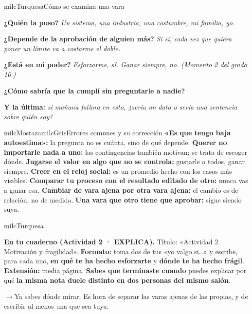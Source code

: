 \documentclass[11pt,letterpaper]{article}
\newcommand{\puente}[1]{%
  \begin{puentebox}%
    \textcolor{milcGradeDark}{$\rightarrow$}\hspace{2mm}#1%
  \end{puentebox}%
}
\begin{document}
\begin{drawbox}{milcTurquesa}{Cómo se examina una vara}
\begin{pasoslista}
\item \textbf{¿Quién la puso?} \emph{Un sistema, una industria, una costumbre, mi familia, yo.}
\item \textbf{¿Depende de la aprobación de alguien más?} \emph{Si sí, cada vez que quiera poner un límite va a costarme el doble.}
\item \textbf{¿Está en mi poder?} \emph{Esforzarme, sí. Ganar siempre, no. \emph{(Momento 2 del grado 10.)}}
\item \textbf{¿Cómo sabría que la cumplí sin preguntarle a nadie?}
\item \textbf{Y la última:} \emph{si mañana fallara en esto, ¿sería un dato o sería una sentencia sobre quién soy?}
\end{pasoslista}
\end{drawbox}

\begin{softbox}{milcMostaza}{milcGris}{Errores comunes y su corrección}
\textbf{«Es que tengo baja autoestima»:} la pregunta no es cuánta, sino de qué depende. \textbf{Querer no importarle nada a uno:} las contingencias también motivan; se trata de escoger dónde. \textbf{Jugarse el valor en algo que no se controla:} gustarle a todos, ganar siempre. \textbf{Creer en el reloj social:} es un promedio hecho con los casos más visibles. \textbf{Comparar tu proceso con el resultado editado de otro:} nunca vas a ganar esa. \textbf{Cambiar de vara ajena por otra vara ajena:} el cambio es de relación, no de medida. \textbf{Una vara que otro tiene que aprobar:} sigue siendo suya.
\end{softbox}

\begin{infoband}{milcTurquesa}


\textbf{En tu cuaderno (Actividad 2 · EXPLICA).} Título: «Actividad 2. Motivación y fragilidad». \textbf{Formato:} toma dos de tus «yo valgo si\ldots» y escribe, para cada uno, \textbf{en qué te ha hecho esforzarte} y \textbf{dónde te ha hecho frágil}. \textbf{Extensión:} media página. \textbf{Sabes que terminaste cuando} puedes explicar por qué \textbf{la misma nota duele distinto en dos personas del mismo salón}.
\end{infoband}

\puente{Ya sabes dónde mirar. Es hora de separar las varas ajenas de las propias, y de escribir al menos una que sea tuya.}
\end{document}
